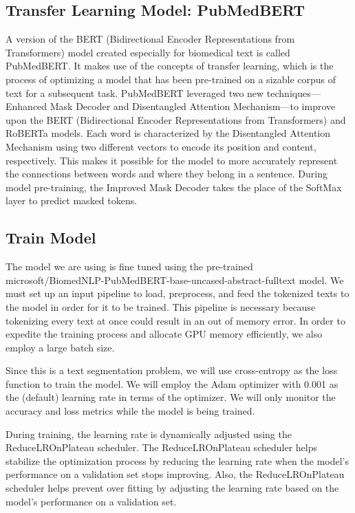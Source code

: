 \documentclass[conference]{IEEEtran}
\begin{document}
\subsection{Transfer Learning Model: PubMedBERT}
A version of the BERT (Bidirectional Encoder Representations from Transformers) model created especially for biomedical text is called PubMedBERT. It makes use of the concepts of transfer learning, which is the process of optimizing a model that has been pre-trained on a sizable corpus of text for a subsequent task. PubMedBERT leveraged two new techniques—Enhanced Mask Decoder and Disentangled Attention Mechanism—to improve upon the BERT (Bidirectional Encoder Representations from Transformers) and RoBERTa models. Each word is characterized by the Disentangled Attention Mechanism using two different vectors to encode its position and content, respectively. This makes it possible for the model to more accurately represent the connections between words and where they belong in a sentence. During model pre-training, the Improved Mask Decoder takes the place of the SoftMax layer to predict masked tokens.



\subsection{Train Model}
The model we are using is fine tuned using the pre-trained microsoft/BiomedNLP-PubMedBERT-base-uncased-abstract-fulltext model. We must set up an input pipeline to load, preprocess, and feed the tokenized texts to the model in order for it to be trained. This pipeline is necessary because tokenizing every text at once could result in an out of memory error. In order to expedite the training process and allocate GPU memory efficiently, we also employ a large batch size.

Since this is a text segmentation problem, we will use cross-entropy as the loss function to train the model. We will employ the Adam optimizer with 0.001 as the (default) learning rate in terms of the optimizer. We will only monitor the accuracy and loss metrics while the model is being trained.

During training, the learning rate is dynamically adjusted using the ReduceLROnPlateau scheduler. The ReduceLROnPlateau scheduler helps stabilize the optimization process by reducing the learning rate when the model's performance on a validation set stops improving. Also, the ReduceLROnPlateau scheduler helps prevent over fitting by adjusting the learning rate based on the model's performance on a validation set. 
\end{document}
